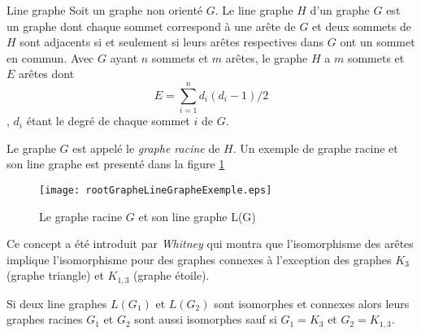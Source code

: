 \begin{definition}  Line graphe \newline
Soit un graphe non orient\'e $G$.
Le line graphe $H$ d'un graphe $G$ est un graphe dont chaque sommet correspond \`a une ar\^ete de $G$ et deux sommets de $H$ sont adjacents si et seulement si leurs ar\^etes respectives dans $G$ ont un sommet en commun. \newline
Avec $G$ ayant $n$ sommets et $m$ ar\^etes, le graphe $H$ a $m$ sommets et $E$ ar\^etes dont 
$$ E = \sum_{i=1 }^{n} d_i(d_i -1)/2$$, 
$d_i$ \'etant le degr\'e de chaque sommet $i$ de $G$.
\end{definition}
Le graphe $G$ est  appel\'e le {\em graphe racine} de $H$. 
Un exemple de graphe racine et son line graphe est present\'e dans la figure \ref{rootGrapheLineGrapheExemple}
\begin{centering}\vspace{-0.5em}
	\begin{figure}[htb!]\vspace{-0.5em}
	\texttt{[image: rootGrapheLineGrapheExemple.eps]}\vspace{-0.5em}
	\caption{ Le graphe racine $G$ et son line graphe L(G) }\vspace{-0.5em}
	\label{rootGrapheLineGrapheExemple}
	\end{figure}
\end{centering}
\newline
Ce concept a \'et\'e introduit par {\em Whitney} \cite{isomorphismeLineGraphe} qui montra que l'isomorphisme des ar\^etes implique l'isomorphisme pour des graphes connexes \`a l'exception des graphes $K_3$ (graphe triangle) et $K_{1,3}$ (graphe \'etoile). 
\begin{theorem}
\label{grapheIsomorphismeEnAretes}
Si deux line graphes $L(G_1)$ et $L(G_2)$ sont isomorphes et connexes alors leurs graphes racines $G_1$ et $G_2$ sont aussi isomorphes sauf si $G_1 = K_3$ et $G_2 = K_{1,3}$.
\end{theorem}


